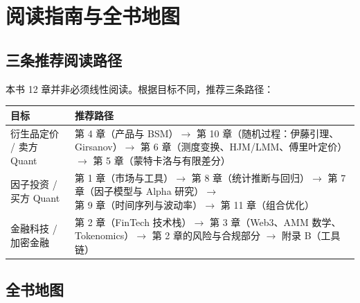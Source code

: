 \chapter*{阅读指南与全书地图}
\thispagestyle{frontstyle}

\section*{三条推荐阅读路径}

本书 12 章并非必须线性阅读。根据目标不同，推荐三条路径：

\vspace{0.4em}
\begin{center}
\tablefont
\begin{tabularx}{\textwidth}{@{}L{2.6cm}Y@{}}
\toprule
\textbf{目标} & \textbf{推荐路径} \\
\midrule
衍生品定价 / 卖方 Quant &
第 4 章（产品与 BSM）$\to$ 第 10 章（随机过程：伊藤引理、Girsanov）$\to$ 第 6 章（测度变换、HJM/LMM、傅里叶定价）$\to$ 第 5 章（蒙特卡洛与有限差分）\\
\midrule
因子投资 / 买方 Quant &
第 1 章（市场与工具）$\to$ 第 8 章（统计推断与回归）$\to$ 第 7 章（因子模型与 Alpha 研究）$\to$ 第 9 章（时间序列与波动率）$\to$ 第 11 章（组合优化）\\
\midrule
金融科技 / 加密金融 &
第 2 章（FinTech 技术栈）$\to$ 第 3 章（Web3、AMM 数学、Tokenomics）$\to$ 第 2 章的风险与合规部分 $\to$ 附录 B（工具链）\\
\bottomrule
\end{tabularx}
\end{center}

\section*{全书地图}

